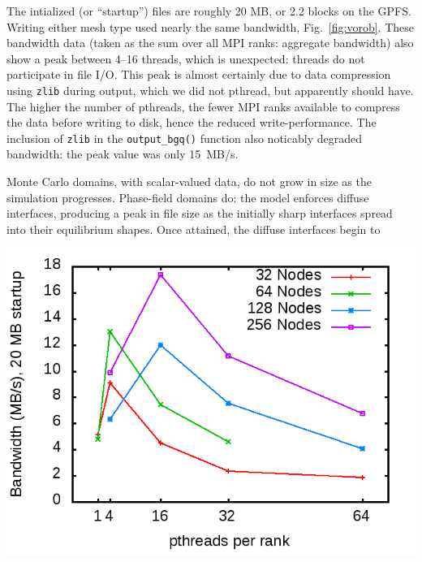 \documentclass[11pt]{article}
\begin{document}
\begin{multicols*}{2}
The intialized (or ``startup'') files are roughly 20 MB, or 2.2 blocks on the GPFS.
Writing either mesh type used nearly the same bandwidth, Fig.~\ref{fig:vorob}.
These bandwidth data (taken as the sum over all MPI ranks: aggregate bandwidth) also show a peak between 4--16 threads, which is unexpected:
threads do not participate in file I/O.
This peak is almost certainly due to data compression using \texttt{zlib} during output, which we did not pthread, but apparently should have.
The higher the number of pthreads, the fewer MPI ranks available to compress the data before writing to disk, hence the reduced write-performance.
The inclusion of \texttt{zlib} in the \texttt{output\_bgq()} function also noticably degraded bandwidth:
the peak value was only 15~MB/s.

Monte Carlo domains, with scalar-valued data, do not grow in size as the simulation progresses.
Phase-field domains do: 
the model enforces diffuse interfaces, producing a peak in file size as the initially sharp interfaces spread into their equilibrium shapes.
Once attained, the diffuse interfaces begin to 
\begin{center}
\begin{minipage}{0.4\textwidth}\centering
  \includegraphics[width=\textwidth]{img/prMC-initBW}


\end{minipage}
\end{center}
\end{multicols*}
\end{document}
